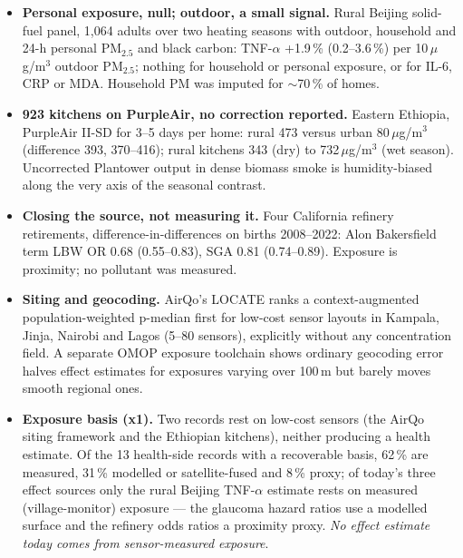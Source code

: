 \documentclass[10pt]{article}
\begin{document}
\footnotesize
\begin{itemize}

\item \textbf{Personal exposure, null; outdoor, a small signal.} Rural Beijing solid-fuel panel, 1,064 adults over two heating seasons with outdoor, household and 24-h personal PM$_{2.5}$ and black carbon: TNF-$\alpha$ +1.9\,\% (0.2--3.6\,\%) per 10\,$\mu$g/m$^3$ outdoor PM$_{2.5}$; nothing for household or personal exposure, or for IL-6, CRP or MDA. Household PM was imputed for $\sim$70\,\% of homes.

\item \textbf{923 kitchens on PurpleAir, no correction reported.} Eastern Ethiopia, PurpleAir II-SD for 3--5 days per home: rural 473 versus urban 80\,$\mu$g/m$^3$ (difference 393, 370--416); rural kitchens 343 (dry) to 732\,$\mu$g/m$^3$ (wet season). Uncorrected Plantower output in dense biomass smoke is humidity-biased along the very axis of the seasonal contrast.

\item \textbf{Closing the source, not measuring it.} Four California refinery retirements, difference-in-differences on births 2008--2022: Alon Bakersfield term LBW OR 0.68 (0.55--0.83), SGA 0.81 (0.74--0.89). Exposure is proximity; no pollutant was measured.

\item \textbf{Siting and geocoding.} AirQo's LOCATE ranks a context-augmented population-weighted p-median first for low-cost sensor layouts in Kampala, Jinja, Nairobi and Lagos (5--80 sensors), explicitly without any concentration field. A separate OMOP exposure toolchain shows ordinary geocoding error halves effect estimates for exposures varying over 100\,m but barely moves smooth regional ones.

\item \textbf{Exposure basis (x1).} Two records rest on low-cost sensors (the AirQo siting framework and the Ethiopian kitchens), neither producing a health estimate. Of the 13 health-side records with a recoverable basis, 62\,\% are measured, 31\,\% modelled or satellite-fused and 8\,\% proxy; of today's three effect sources only the rural Beijing TNF-$\alpha$ estimate rests on measured (village-monitor) exposure --- the glaucoma hazard ratios use a modelled surface and the refinery odds ratios a proximity proxy. \emph{No effect estimate today comes from sensor-measured exposure}.

\end{itemize}
\end{document}
